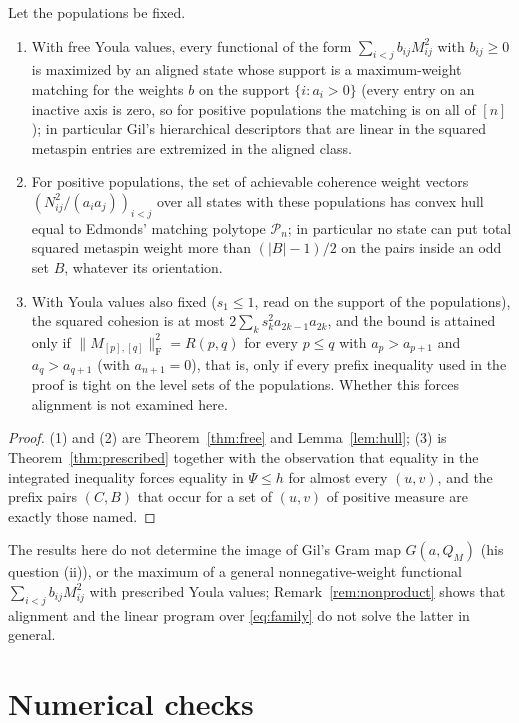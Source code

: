 \documentclass[11pt]{article}
\newcommand{\F}{\mathrm F}
\newcommand{\cP}{\mathcal P}
\begin{document}
\begin{corollary}\label{cor:consequences}
Let the populations be fixed.
\begin{enumerate}
\item With free Youla values, every functional of the form
$\sum_{i<j}b_{ij}M_{ij}^2$ with $b_{ij}\ge0$ is maximized by an aligned state
whose support is a maximum-weight matching for the weights $b$ on the support
$\{i:a_i>0\}$ (every entry on an inactive axis is zero, so for positive
populations the matching is on all of $[n]$); in particular Gil's
hierarchical descriptors that are linear in the squared metaspin entries are
extremized in the aligned class.
\item For positive populations, the set of achievable coherence weight vectors
$(N_{ij}^2/(a_ia_j))_{i<j}$ over all states with these populations has convex
hull equal to Edmonds' matching polytope $\cP_n$; in particular no state can
put total squared metaspin weight more than $(|B|-1)/2$ on the pairs inside an
odd set $B$, whatever its orientation.
\item With Youla values also fixed ($s_1\le1$, read on the support of the
populations), the squared cohesion is at most
$2\sum_ks_k^2a_{2k-1}a_{2k}$, and the bound is attained only if
$\|M_{[p],[q]}\|_\F^2=R(p,q)$ for every $p\le q$ with $a_p>a_{p+1}$ and
$a_q>a_{q+1}$ (with $a_{n+1}=0$), that is, only if every prefix inequality
used in the proof is tight on the level sets of the populations. Whether this
forces alignment is not examined here.
\end{enumerate}
\end{corollary}

\begin{proof}
(1) and (2) are Theorem~\ref{thm:free} and Lemma~\ref{lem:hull}; (3) is
Theorem~\ref{thm:prescribed} together with the observation that equality in
the integrated inequality forces equality in $\Psi\le h$ for almost every
$(u,v)$, and the prefix pairs $(C,B)$ that occur for a set of $(u,v)$ of
positive measure are exactly those named.
\end{proof}

The results here do not determine the image of Gil's Gram map $G(a,Q_M)$
(his question (ii)), or the maximum of a general nonnegative-weight
functional $\sum_{i<j}b_{ij}M_{ij}^2$ with prescribed Youla values;
Remark~\ref{rem:nonproduct} shows that alignment and the linear program over
\eqref{eq:family} do not solve the latter in general.

\section{Numerical checks}\label{sec:checks}
\end{document}
